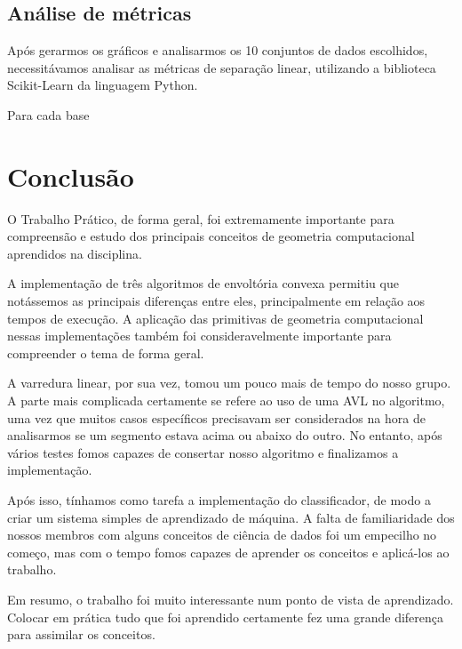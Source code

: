 \documentclass{article}
\begin{document}
\subsection{Análise de métricas}

Após gerarmos os gráficos e analisarmos os 10 conjuntos de dados escolhidos, necessitávamos analisar as métricas de separação linear, utilizando a biblioteca Scikit-Learn da linguagem Python.

Para cada base

\section{Conclusão}

O Trabalho Prático, de forma geral, foi extremamente importante para compreensão e estudo dos principais conceitos de geometria computacional aprendidos na disciplina.

A implementação de três algoritmos de envoltória convexa permitiu que notássemos as principais diferenças entre eles, principalmente em relação aos tempos de execução. A aplicação das primitivas de geometria computacional nessas implementações também foi consideravelmente importante para compreender o tema de forma geral.

A varredura linear, por sua vez, tomou um pouco mais de tempo do nosso grupo. A parte mais complicada certamente se refere ao uso de uma AVL no algoritmo, uma vez que muitos casos específicos precisavam ser considerados na hora de analisarmos se um segmento estava acima ou abaixo do outro. No entanto, após vários testes fomos capazes de consertar nosso algoritmo e finalizamos a implementação.

Após isso, tínhamos como tarefa a implementação do classificador, de modo a criar um sistema simples de aprendizado de máquina. A falta de familiaridade dos nossos membros com alguns conceitos de ciência de dados foi um empecilho no começo, mas com o tempo fomos capazes de aprender os conceitos e aplicá-los ao trabalho.

Em resumo, o trabalho foi muito interessante num ponto de vista de aprendizado. Colocar em prática tudo que foi aprendido certamente fez uma grande diferença para assimilar os conceitos.

\printbibliography
\end{document}
